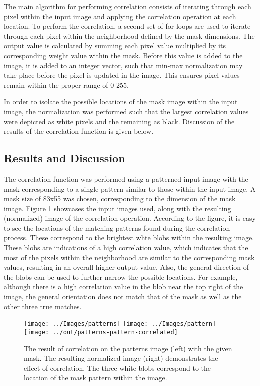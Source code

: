 \documentclass[headings=optiontoheadandtoc,listof=totoc,parskip=full]{scrartcl}
\begin{document}
The main algorithm for performing correlation consists of iterating through each pixel within the input image and applying the correlation operation at each location. To perform the correlation, a  second set of for loops are used to iterate through each pixel within the neighborhood defined by the mask dimensions. The output value is calculated by summing each pixel value multiplied by its corresponding weight value within the mask. Before this value is added to the image, it is added to an integer vector, such that min-max normalization may take place before the pixel is updated in the image. This ensures pixel values remain within the proper range of 0-255.

In order to isolate the possible locations of the mask image within the input image, the normalization was performed such that the largest correlation values were depicted as white pixels and the remaining as black. Discussion of the results of the correlation function is given below.



\subsection{Results and Discussion}

The correlation function was performed using a patterned input image with the mask corresponding to a single pattern similar to those within the input image. A mask size of 83x55 was chosen, corresponding to the dimension of the mask image. Figure 1 showcases the input images used, along with the resulting (normalized)  image of the correlation operation. According to the figure, it is easy to see the locations of the matching patterns found during the correlation process. These correspond to the brightest whte blobs within the resulting image. These blobs are indications of a high correlation value, which indicates that the most of the pixels within the neighborhood are similar to the corresponding mask values, resulting in an overall higher output value. Also, the general direction of the blobs can be used to further narrow the possible locations. For example, although there is a high correlation value in the blob near the top right of the image, the general orientation does not match that of the mask as well as the other three true matches.


\begin{figure}[ht]
	\centering
	\texttt{[image: ../Images/patterns]}
	\texttt{[image: ../Images/pattern]}
	\texttt{[image: ../out/patterns-pattern-correlated]}
	\caption{The result of correlation on the patterns image (left) with the given mask. The resulting normalized image (right) demonstrates the effect of correlation. The three white blobs correspond to the location of the mask pattern within the image.}
	\label{fig:correlation-result-1}
\end{figure}
\end{document}

